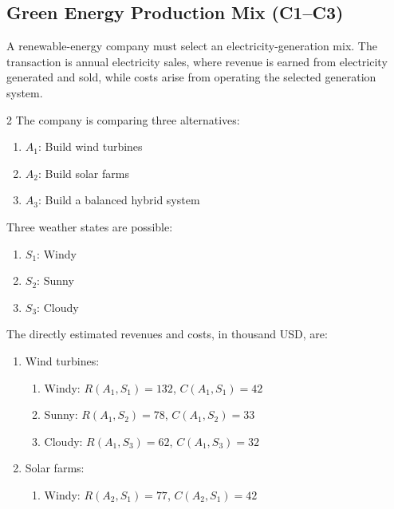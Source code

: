 
\subsection{Green Energy Production Mix (C1--C3)}
\label{sec:problem4-green-energy-production-mix-c1-c3}

A renewable-energy company must select an electricity-generation mix.
The transaction is annual electricity sales, where revenue is earned from
electricity generated and sold, while costs arise from operating the selected
generation system.

\begin{multicols}{2}
	The company is comparing three alternatives:
	\begin{enumerate}[label=\arabic*.]
		\item \(A_1\): Build wind turbines
		\item \(A_2\): Build solar farms
		\item \(A_3\): Build a balanced hybrid system
	\end{enumerate}
	
	Three weather states are possible:
	\begin{enumerate}[label=\arabic*.]
		\item \(S_1\): Windy
		\item \(S_2\): Sunny
		\item \(S_3\): Cloudy
	\end{enumerate}
	
	\columnbreak
	
	The directly estimated revenues and costs, in thousand USD, are:
	\begin{enumerate}[label=\arabic*.]
		\item Wind turbines:
		\begin{enumerate}[label=\roman*)]
			\item Windy:
			\(R(A_1,S_1)=132\), \(C(A_1,S_1)=42\)
			
			\item Sunny:
			\(R(A_1,S_2)=78\), \(C(A_1,S_2)=33\)
			
			\item Cloudy:
			\(R(A_1,S_3)=62\), \(C(A_1,S_3)=32\)
		\end{enumerate}
		
		\item Solar farms:
		\begin{enumerate}[label=\roman*)]
			\item Windy:
			\(R(A_2,S_1)=77\), \(C(A_2,S_1)=42\)
			

\end{enumerate}
\end{enumerate}
\end{multicols}
